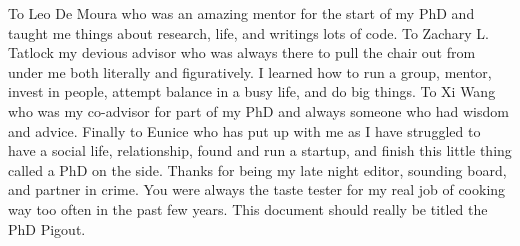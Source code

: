 To Leo De Moura who was an amazing mentor for the start of
    my PhD and taught me things about research, life, and writings lots of code.
To Zachary L. Tatlock my devious advisor who was always there
    to pull the chair out from under me both literally and figuratively.
I learned how to run a group, mentor, invest in people, attempt
    balance in a busy life, and do big things.
To Xi Wang who was my co-advisor for part of my PhD
    and always someone who had wisdom and advice.
Finally to Eunice who has put up with me as I have struggled
    to have a social life, relationship, found and run a startup,
    and finish this little thing called a PhD on the side.
Thanks for being my late night editor, sounding board, and
    partner in crime.
You were always the taste tester for my real job
    of cooking way too often in the past few years.
This document should really be titled the PhD Pigout.
